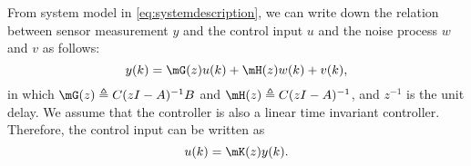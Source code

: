 %
% 


From system model in \eqref{eq:systemdescription}, we can write down the relation between sensor measurement $y$ and the control input $u$ and the noise process $w$ and $v$ as follows:
\begin{equation}
  y(k)=\mG(z)u(k)+\mH(z)w(k)+v(k),
  \label{eq:utoy}
\end{equation}
in which $\mG(z)\triangleq C(zI-A)^{-1}B$ and $\mH(z)\triangleq C(zI-A)^{-1}$, and $z^{-1}$ is the unit delay. We assume that the controller is also a linear time invariant controller. Therefore, the control input can be written as 
\begin{equation}
  u(k)=\mK(z)y(k).
  \label{eq:ytou}
\end{equation}

